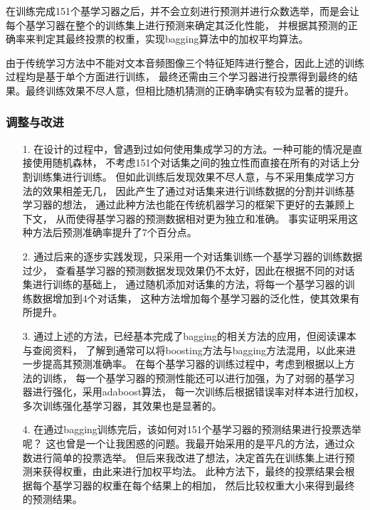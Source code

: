 \documentclass[11pt]{article}
\begin{document}
            在训练完成151个基学习器之后，并不会立刻进行预测并进行众数选举，而是会让每个基学习器在整个的训练集上进行预测来确定其泛化性能，
            并根据其预测的正确率来判定其最终投票的权重，实现bagging算法中的加权平均算法。

            由于传统学习方法中不能对文本音频图像三个特征矩阵进行整合，因此上述的训练过程均是基于单个方面进行训练，
            最终还需由三个学习器进行投票得到最终的结果。最终训练效果不尽人意，但相比随机猜测的正确率确实有较为显著的提升。



            \subsubsection{调整与改进}
            \begin{enumerate}
                \item [1.]在设计的过程中，曾遇到过如何使用集成学习的方法。一种可能的情况是直接使用随机森林，
                        不考虑151个对话集之间的独立性而直接在所有的对话上分割训练集进行训练。
                        但如此训练后发现效果不尽人意，与不采用集成学习方法的效果相差无几，
                        因此产生了通过对话集来进行训练数据的分割并训练基学习器的想法，
                        通过此种方法也能在传统机器学习的框架下更好的去兼顾上下文，
                        从而使得基学习器的预测数据相对更为独立和准确。
                        事实证明采用这种方法后预测准确率提升了7个百分点。
                \item [2.]通过后来的逐步实践发现，只采用一个对话集训练一个基学习器的训练数据过少，
                        查看基学习器的预测数据发现效果仍不太好，因此在根据不同的对话集进行训练的基础上，
                        通过随机添加对话集的方法，将每一个基学习器的训练数据增加到4个对话集，
                        这种方法增加每个基学习器的泛化性，使其效果有所提升。
                \item [3.]通过上述的方法，已经基本完成了bagging的相关方法的应用，但阅读课本与查阅资料，
                        了解到通常可以将boosting方法与bagging方法混用，以此来进一步提高其预测准确率。
                        在每个基学习器的训练过程中，考虑到根据以上方法的训练，
                        每一个基学习器的预测性能还可以进行加强，为了对弱的基学习器进行强化，采用adaboost算法，
                        每一次训练后根据错误率对样本进行加权，多次训练强化基学习器，其效果也是显著的。
                \item [4.]在通过bagging训练完后，该如何对151个基学习器的预测结果进行投票选举呢？
                        这也曾是一个让我困惑的问题。我最开始采用的是平凡的方法，通过众数进行简单的投票选举。
                        但后来我改进了想法，决定首先在训练集上进行预测来获得权重，由此来进行加权平均法。
                        此种方法下，最终的投票结果会根据每个基学习器的权重在每个结果上的相加，
                        然后比较权重大小来得到最终的预测结果。
            \end{enumerate}
\end{document}
